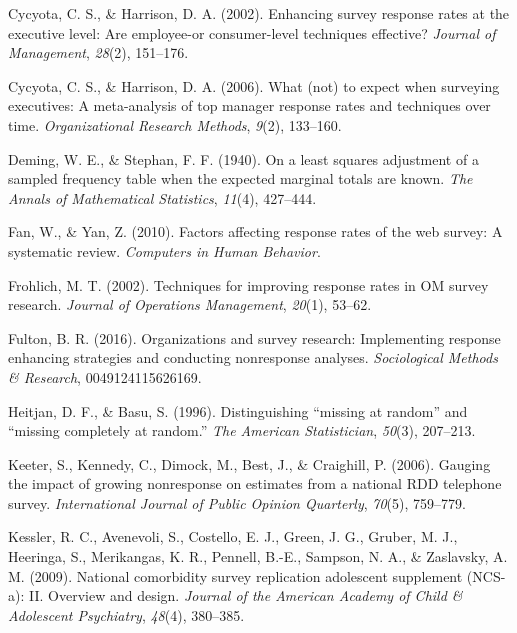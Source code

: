 \documentclass[
  man,floatsintext]{apa7}
\newlength{\cslhangindent}
\newlength{\cslentryspacingunit} %
\newenvironment{CSLReferences}[2] %
 {%
  \setlength{\parindent}{0pt}
  \ifodd #1
  \let\oldpar\par
  \def\par{\hangindent=\cslhangindent\oldpar}
  \fi
  \setlength{\parskip}{#2\cslentryspacingunit}
 }%
 {}
\begin{document}
\begin{CSLReferences}{1}{0}
\leavevmode{}%
Cycyota, C. S., \& Harrison, D. A. (2002). Enhancing survey response rates at the executive level: Are employee-or consumer-level techniques effective? \emph{Journal of Management}, \emph{28}(2), 151--176.

\leavevmode{}%
Cycyota, C. S., \& Harrison, D. A. (2006). What (not) to expect when surveying executives: A meta-analysis of top manager response rates and techniques over time. \emph{Organizational Research Methods}, \emph{9}(2), 133--160.

\leavevmode{}%
Deming, W. E., \& Stephan, F. F. (1940). On a least squares adjustment of a sampled frequency table when the expected marginal totals are known. \emph{The Annals of Mathematical Statistics}, \emph{11}(4), 427--444.

\leavevmode{}%
Fan, W., \& Yan, Z. (2010). Factors affecting response rates of the web survey: A systematic review. \emph{Computers in Human Behavior}.

\leavevmode{}%
Frohlich, M. T. (2002). Techniques for improving response rates in {OM} survey research. \emph{Journal of Operations Management}, \emph{20}(1), 53--62.

\leavevmode{}%
Fulton, B. R. (2016). Organizations and survey research: Implementing response enhancing strategies and conducting nonresponse analyses. \emph{Sociological Methods \& Research}, 0049124115626169.

\leavevmode{}%
Heitjan, D. F., \& Basu, S. (1996). Distinguishing {``missing at random''} and {``missing completely at random.''} \emph{The American Statistician}, \emph{50}(3), 207--213.

\leavevmode{}%
Keeter, S., Kennedy, C., Dimock, M., Best, J., \& Craighill, P. (2006). Gauging the impact of growing nonresponse on estimates from a national {RDD} telephone survey. \emph{International Journal of Public Opinion Quarterly}, \emph{70}(5), 759--779.

\leavevmode{}%
Kessler, R. C., Avenevoli, S., Costello, E. J., Green, J. G., Gruber, M. J., Heeringa, S., Merikangas, K. R., Pennell, B.-E., Sampson, N. A., \& Zaslavsky, A. M. (2009). National comorbidity survey replication adolescent supplement ({NCS}-a): {II}. Overview and design. \emph{Journal of the American Academy of Child \& Adolescent Psychiatry}, \emph{48}(4), 380--385.


\end{CSLReferences}
\end{document}
